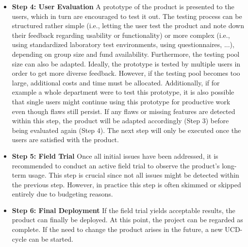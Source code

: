 \documentclass[draft,final]{vutinfth} %
\begin{document}
\begin{itemize}
\item \textbf{Step 4: User Evaluation} A prototype of the product is presented to the users, which in turn are encouraged to test it out. The testing process can be structured rather simple (i.e., letting the user test the product and note down their feedback regarding usability or functionality) or more complex (i.e., using standardized laboratory test environments, using questionnaires, ...), depending on group size and fund availability. Furthermore, the testing pool size can also be adapted. Ideally, the prototype is tested by multiple users in order to get more diverse feedback. However, if the testing pool becomes too large, additional costs and time must be allocated. Additionally, if for example a whole department were to test this prototype, it is also possible that single users might continue using this prototype for productive work even though flaws still persist. If any flaws or missing features are detected within this step, the product will be adapted accordingly (Step 3) before being evaluated again (Step 4). The next step will only be executed once the users are satisfied with the product.

\item \textbf{Step 5: Field Trial} Once all initial issues have been addressed, it is recommended to conduct an active field trial to observe the product's long-term usage. This step is crucial since not all issues might be detected within the previous step. However, in practice this step is often skimmed or skipped entirely due to budgeting reasons.

\item \textbf{Step 6: Final Deployment} If the field trial yields acceptable results, the product can finally be deployed. At this point, the project can be regarded as complete. If the need to change the product arises in the future, a new UCD-cycle can be started.
\end{itemize}
\end{document}
